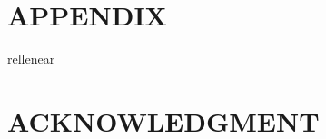 \documentclass[letterpaper, 10 pt, conference]{ieeeconf}
\begin{document}

\section*{APPENDIX}

rellenear

\section*{ACKNOWLEDGMENT}

\begin{thebibliography}{99}



\end{thebibliography}
\end{document}
